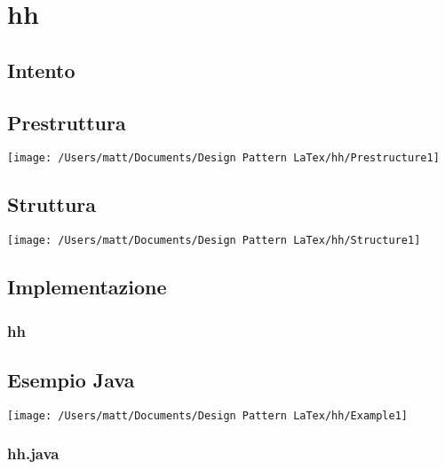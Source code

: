 \chapter{hh}
\section{Intento}




\section{Prestruttura}

\texttt{[image: /Users/matt/Documents/Design Pattern LaTex/hh/Prestructure1]}


\section{Struttura}

\texttt{[image: /Users/matt/Documents/Design Pattern LaTex/hh/Structure1]}


\section{Implementazione}

\subsection{hh}



\section{Esempio Java}
\texttt{[image: /Users/matt/Documents/Design Pattern LaTex/hh/Example1]}

\subsection{hh.java}
\begin{lstlisting}[language=java]

\end{lstlisting}
